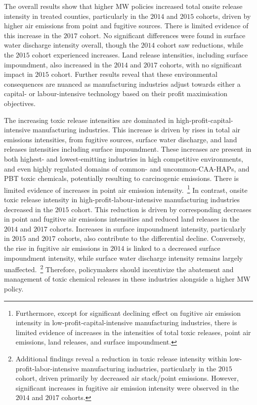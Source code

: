 \documentclass{C:/Users/david/OneDrive/Documents/ULMS/PhD/Thesis/chapter3/src/climate_change/latex/Economic_Journal/OUP-EJ}
\begin{document}
    The overall results show that higher MW policies increased total onsite release intensity in treated counties, particularly in the $2014$ and $2015$ cohorts, driven by higher air emissions from point and fugitive sources. There is limited evidence of this increase in the $2017$ cohort. No significant differences were found in surface water discharge intensity overall, though the $2014$ cohort saw reductions, while the $2015$ cohort experienced increases. Land release intensities, including surface impoundment, also increased in the $2014$ and $2017$ cohorts, with no significant impact in $2015$ cohort. Further results reveal that these environmental consequences are nuanced as manufacturing industries adjust towards either a capital- or labour-intensive technology based on their profit maximisation objectives.

    The increasing toxic release intensities are dominated in high-profit-capital-intensive manufacturing industries. This increase is driven by rises in total air emissions intensities, from fugitive sources, surface water discharge, and land releases intensities including surface impoundment. These increases are present in both highest- and lowest-emitting industries in high competitive environments, and even highly regulated domains of common- and uncommon-CAA-HAPs, and PBT toxic chemicals, potentially resulting to carcinogenic emissions. There is limited evidence of increases in point air emission intensity.~\footnote{Furthermore, except for significant declining effect on fugitive air emission intensity in low-profit-capital-intensive manufacturing industries, there is limited evidence of increases in the intensities of total toxic releases, point air emissions, land releases, and surface impoundment.} In contrast, onsite toxic release intensity in high-profit-labour-intensive manufacturing industries decreased in the $2015$ cohort. This reduction is driven by corresponding decreases in point and fugitive air emissions intensities and reduced land releases in the $2014$ and $2017$ cohorts. Increases in surface impoundment intensity, particularly in $2015$ and $2017$ cohorts, also contribute to the differential decline. Conversely, the rise in fugitive air emissions in $2014$ is linked to a decreased surface impoundment intensity, while surface water discharge intensity remains largely unaffected.~\footnote{Additional findings reveal a reduction in toxic release intensity within low-profit-labor-intensive manufacturing industries, particularly in the $2015$ cohort, driven primarily by decreased air stack/point emissions. However, significant increases in fugitive air emission intensity were observed in the $2014$ and $2017$ cohorts.} Therefore, policymakers should incentivize the abatement and management of toxic chemical releases in these industries alongside a higher MW policy.
\end{document}

